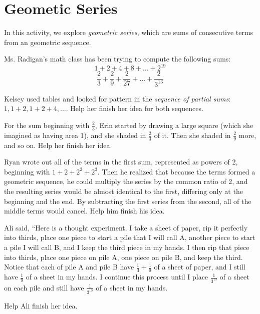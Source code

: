 \newpage
\section{Geometic Series}\label{A:geometicSeries}

In this activity, we explore \emph{geometric series}, which are sums of consecutive terms from an geometric sequence.

Ms. Radigan's math class has been trying to compute the following sums:  
$$1+2+4+8+\dots+2^{19}$$
$$\frac{2}{3}+\frac{2}{9}+\frac{2}{27}+\dots+\frac{2}{3^{13}}$$

\begin{prob}
Kelsey used tables and looked for pattern in the \emph{sequence of partial sums}:  $1, 1+2, 1+2+4, \dots$.  Help her finish her idea for both sequences.    
\end{prob}

\begin{prob}
For the sum beginning with $\frac{2}{3}$, Erin started by drawing a large square (which she imagined as having area 1), and she shaded in $\frac{2}{3}$ of it.  Then she shaded in $\frac{2}{9}$ more, and so on.  Help her finish her idea.  
\end{prob}

\begin{prob}
Ryan wrote out all of the terms in the first sum, represented as powers of 2, beginning with $1+2+2^2+2^3$.  
Then he realized that because the terms formed a geometric sequence, he could multiply the series by the common ratio of 2, and the resulting series would be almost identical to the first, differing only at the beginning and the end.  By subtracting the first series from the second, all of the middle terms would cancel.  Help him finish his idea.  
\end{prob}

\begin{prob}
Ali said, ``Here is a thought experiment.  I take a sheet of paper, rip it perfectly into thirds, place one piece to start a pile that I will call A, another piece to start a pile I will call B, and I keep the third piece in my hands.  I then rip that piece into thirds, place one piece on pile A, one piece on pile B, and keep the third.  Notice that each of pile A and pile B have $\frac{1}{3}+\frac{1}{9}$ of a sheet of paper, and I still have $\frac{1}{9}$ of a sheet in my hands.  I continue this process until I place $\frac{1}{3^{13}}$ of a sheet on each pile and still have $\frac{1}{3^{13}}$ of a sheet in my hands.  

Help Ali finish her idea.  
\end{prob}


